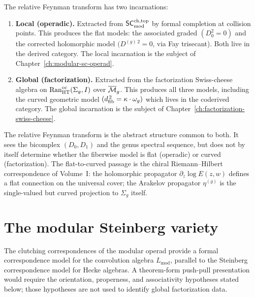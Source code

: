 \begin{remark}
\label{rem:rft-local-global}
The relative Feynman transform has two incarnations:
\begin{enumerate}[label=\textup{(\roman*)}]
\item \textbf{Local (operadic).} Extracted from $\mathsf{SC}^{\mathrm{ch,top}}_{\mathrm{mod}}$
 by formal completion at collision points. This produces the
 flat models: the associated graded $(D_0^2 = 0)$ and the
 corrected holomorphic model $(D^{(g)\,2} = 0$, via Fay
 trisecant). Both live in the derived category. The local
 incarnation is the subject of
 Chapter~\ref{ch:modular-sc-operad}.
\item \textbf{Global (factorization).} Extracted from the
 factorization Swiss-cheese algebra on
 $\operatorname{Ran}^{\mathrm{oc}}_{\mathrm{HT}}(\Sigma_g,I)$ over
 $\overline{\mathcal{M}}_g$. This produces all three models,
 including the curved geometric model $(d_{\mathrm{fib}}^{\,2} =
 \kappa \cdot \omega_g)$ which lives in the coderived
 category. The global incarnation is the subject of
 Chapter~\ref{ch:factorization-swiss-cheese}.
\end{enumerate}
The relative Feynman transform is the abstract structure common
to both. It sees the bicomplex $(D_0, D_1)$ and the genus
spectral sequence, but does not by itself determine whether the
fiberwise model is flat (operadic) or curved (factorization).
The flat-to-curved passage is the chiral Riemann--Hilbert
correspondence of Volume~I: the holomorphic propagator
$\partial_z \log E(z,w)$ defines a flat connection on the
universal cover; the Arakelov propagator $\eta^{(g)}$ is the
single-valued but curved projection to $\Sigma_g$ itself.
\end{remark}

\section{The modular Steinberg variety}
\label{sec:modular-steinberg}

The clutching correspondences of the modular operad provide a formal
correspondence model for the convolution algebra $L_{\mathrm{mod}}$,
parallel to the Steinberg correspondence model for Hecke algebras. A
theorem-form push-pull presentation would require the orientation,
properness, and associativity hypotheses stated below; those hypotheses
are not used to identify global factorization data.

